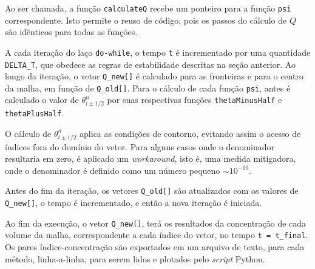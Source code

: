 Ao ser chamada, a função \verb|calculateQ| recebe um ponteiro para a função
\verb|psi| correspondente. Isto permite o reuso de código, pois os passos do
cálculo de $Q$ são idênticos para todas as funções.

A cada iteração do laço \verb|do-while|, o tempo \verb|t| é incrementado por uma
quantidade \verb|DELTA_T|, que obedece as regras de estabilidade descritas na
seção anterior. Ao longo da iteração, o vetor \verb|Q_new[]| é calculado para as
fronteiras e para o centro da malha, em função de \verb|Q_old[]|. Para o
cálculo de cada função \verb|psi|, antes é calculado o valor de
$\theta_{i\pm1/2}^n$ por suas respectivas funções \verb|thetaMinusHalf| e
\verb|thetaPlusHalf|.

O cálculo de $\theta_{i\pm1/2}^n$ aplica as condições de contorno, evitando
assim o acesso de índices fora do domínio do vetor. Para alguns casos onde o
denominador resultaria em zero, é aplicado um \textit{workaround}, isto é, uma
medida mitigadora, onde o denominador é definido como um número pequeno
$\sim 10^{-10}$.

Antes do fim da iteração, os vetores \verb|Q_old[]| são atualizados com os
valores de \verb|Q_new[]|, o tempo é incrementado, e então a nova iteração é
iniciada.

Ao fim da execução, o vetor \verb|Q_new[]|, terá os resultados da concentração
de cada volume da malha, correspondente a cada índice do vetor, no tempo
\verb|t = t_final|. Os pares índice-concentração são exportados em um arquivo
de texto, para cada método, linha-a-linha, para serem lidos e plotados pelo
\textit{script} Python.
